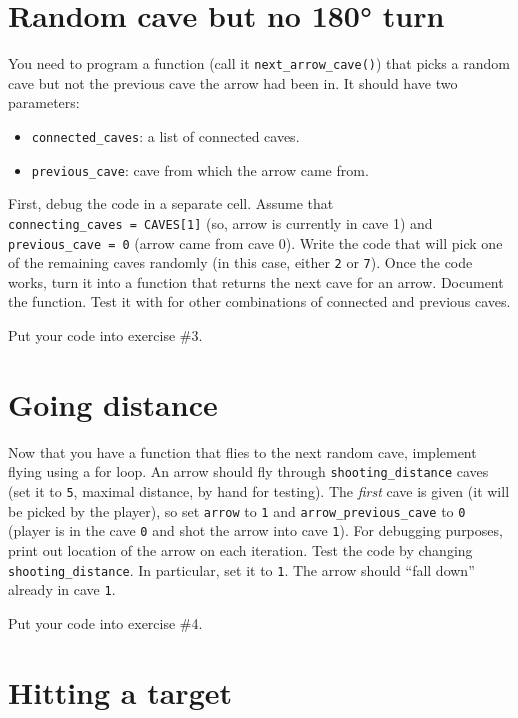 \documentclass[
]{book}
\providecommand{\tightlist}{%
  \setlength{\itemsep}{0pt}\setlength{\parskip}{0pt}}
\begin{document}
\hypertarget{random-cave-but-no-180-turn}{%
\section{Random cave but no 180° turn}\label{random-cave-but-no-180-turn}}

You need to program a function (call it \texttt{next\_arrow\_cave()}) that picks a random cave but not the previous cave the arrow had been in. It should have two parameters:

\begin{itemize}
\tightlist
\item
  \texttt{connected\_caves}: a list of connected caves.
\item
  \texttt{previous\_cave}: cave from which the arrow came from.
\end{itemize}

First, debug the code in a separate cell. Assume that \texttt{connecting\_caves\ =\ CAVES{[}1{]}} (so, arrow is currently in cave 1) and \texttt{previous\_cave\ =\ 0} (arrow came from cave 0). Write the code that will pick one of the remaining caves randomly (in this case, either \texttt{2} or \texttt{7}). Once the code works, turn it into a function that returns the next cave for an arrow. Document the function. Test it with for other combinations of connected and previous caves.

Put your code into exercise \#3.

\hypertarget{going-distance}{%
\section{Going distance}\label{going-distance}}

Now that you have a function that flies to the next random cave, implement flying using a for loop. An arrow should fly through \texttt{shooting\_distance} caves (set it to \texttt{5}, maximal distance, by hand for testing). The \emph{first} cave is given (it will be picked by the player), so set \texttt{arrow} to \texttt{1} and \texttt{arrow\_previous\_cave} to \texttt{0} (player is in the cave \texttt{0} and shot the arrow into cave \texttt{1}). For debugging purposes, print out location of the arrow on each iteration. Test the code by changing \texttt{shooting\_distance}. In particular, set it to \texttt{1}. The arrow should ``fall down'' already in cave \texttt{1}.

Put your code into exercise \#4.

\hypertarget{hitting-a-target}{%
\section{Hitting a target}\label{hitting-a-target}}
\end{document}
